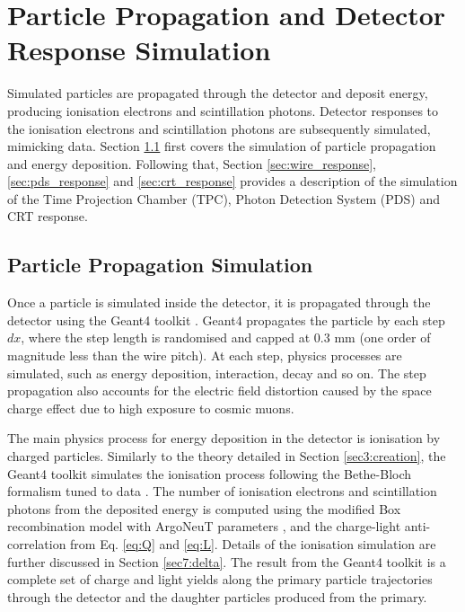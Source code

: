 \section{Particle Propagation and Detector Response Simulation}
\label{sec:gen_response}

Simulated particles are propagated through the detector and deposit energy, producing ionisation electrons and scintillation photons.
Detector responses to the ionisation electrons and scintillation photons are subsequently simulated, mimicking data. 
Section \ref{sec:gen_g4} first covers the simulation of particle propagation and energy deposition.
Following that, Section \ref{sec:wire_response}, \ref{sec:pds_response} and \ref{sec:crt_response} provides a description of the simulation of the Time Projection Chamber (TPC), Photon Detection System (PDS) and CRT response. 

\subsection{Particle Propagation Simulation}
\label{sec:gen_g4}

Once a particle is simulated inside the detector, it is propagated through the detector using the Geant4 toolkit \cite{geant4}.
Geant4 propagates the particle by each step $dx$, where the step length is randomised and capped at 0.3 mm (one order of magnitude less than the wire pitch).
At each step, physics processes are simulated, such as energy deposition, interaction, decay and so on.
The step propagation also accounts for the electric field distortion caused by the space charge effect due to high exposure to cosmic muons.

The main physics process for energy deposition in the detector is ionisation by charged particles.
Similarly to the theory detailed in Section \ref{sec3:creation}, the Geant4 toolkit simulates the ionisation process following the Bethe-Bloch formalism tuned to data \cite{geant4_ions}.
The number of ionisation electrons and scintillation photons from the deposited energy is computed using the modified Box recombination model with ArgoNeuT parameters \cite{argoneut_recomb}, and the charge-light anti-correlation from Eq. \ref{eq:Q} and \ref{eq:L}. 
Details of the ionisation simulation are further discussed in Section \ref{sec7:delta}.
The result from the Geant4 toolkit is a complete set of charge and light yields along the primary particle trajectories through the detector and the daughter particles produced from the primary.


